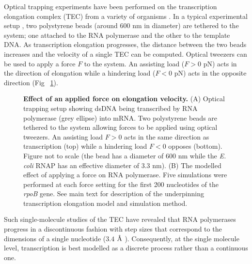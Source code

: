 \documentclass[10pt,letterpaper]{article}
\newcommand{\angstrom}{\mbox{\normalfont\AA}}
\begin{document}
Optical trapping experiments have been performed on the transcription elongation complex (TEC) from a variety of organisms \cite{abbondanzieri2005direct, adelman2002single, bai2007mechanochemical, hodges2009nucleosomal, galburt2007backtracking, skinner2004promoter, dulin2015elongation}. In a typical experimental setup \cite{abbondanzieri2005direct}, two polystyrene beads (around 600 nm in diameter) are tethered to the system; one attached to the RNA polymerase and the other to the template DNA. As transcription elongation progresses, the distance between the two beads increases and the velocity of a single TEC can be computed. Optical tweezers can be used to apply a force $F$ to the system. An assisting load ($F > 0$ pN) acts in the direction of elongation while a hindering load ($F < 0$ pN) acts in the opposite direction (Fig ~\ref{fig1}).  \par

\begin{figure}[!h]
\caption{{\bf Effect of an applied force on elongation velocity.}
(A) Optical trapping setup  \cite{abbondanzieri2005direct} showing dsDNA being transcribed by RNA polymerase (grey ellipse) into mRNA. Two polystyrene beads are tethered to the system allowing forces to be applied using optical tweezers. An assisting load $F>0$ acts in the same direction as transcription (top) while a hindering load $F<0$ opposes (bottom). Figure not to scale (the bead has a diameter of 600 nm while the {\it E. coli} RNAP has an effective diameter of 3.3 nm). (B) The modelled effect of applying a force on RNA polymerase. Five simulations were performed at each force setting for the first 200 nucleotides of the {\it rpoB} gene. See main text for description of the underpinning transcription elongation model and simulation method. }
\label{fig1}
\end{figure}




Such single-molecule studies of the TEC have revealed that RNA polymerases progress in a discontinuous fashion \cite{abbondanzieri2005direct, neuman2003ubiquitous, davenport2000single, tolic2004diversity, abbondanzieri2005picocalorimetry} with step sizes that correspond to the dimensions of a single nucleotide ($3.4$ $\angstrom$ \cite{watson1953molecular}). Consequently, at the single molecule level, transcription is best modelled as a discrete process rather than a continuous one.    \par
\end{document}
